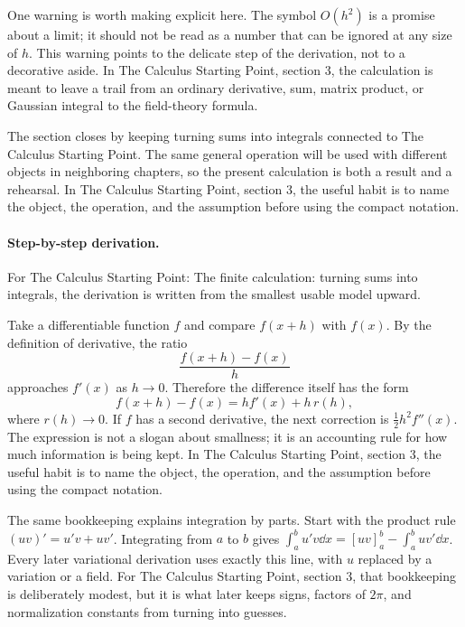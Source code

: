One warning is worth making explicit here.  The symbol \(O(h^2)\) is a promise about a limit; it should not be read as a number that can be ignored at any size of \(h\).  This warning points to the delicate step of the derivation, not to a decorative aside.  In The Calculus Starting Point, section 3, the calculation is meant to leave a trail from an ordinary derivative, sum, matrix product, or Gaussian integral to the field-theory formula.

The section closes by keeping turning sums into integrals connected to The Calculus Starting Point.  The same general operation will be used with different objects in neighboring chapters, so the present calculation is both a result and a rehearsal.  In The Calculus Starting Point, section 3, the useful habit is to name the object, the operation, and the assumption before using the compact notation.



\paragraph{Step-by-step derivation.}

For The Calculus Starting Point: The finite calculation: turning sums into integrals, the derivation is written from the smallest usable model upward.

Take a differentiable function \(f\) and compare \(f(x+h)\) with \(f(x)\).  By the definition of derivative, the ratio
\[
  \frac{f(x+h)-f(x)}{h}
\]
approaches \(f'(x)\) as \(h\to0\).  Therefore the difference itself has the form
\[
  f(x+h)-f(x)=hf'(x)+h\,r(h),
\]
where \(r(h)\to0\).  If \(f\) has a second derivative, the next correction is \(\frac12h^2f''(x)\).  The expression is not a slogan about smallness; it is an accounting rule for how much information is being kept.  In The Calculus Starting Point, section 3, the useful habit is to name the object, the operation, and the assumption before using the compact notation.

The same bookkeeping explains integration by parts.  Start with the product rule \((uv)'=u'v+uv'\).  Integrating from \(a\) to \(b\) gives \(\int_a^b u'v\dd x=[uv]_a^b-\int_a^buv'\dd x\).  Every later variational derivation uses exactly this line, with \(u\) replaced by a variation or a field.  For The Calculus Starting Point, section 3, that bookkeeping is deliberately modest, but it is what later keeps signs, factors of \(2\pi\), and normalization constants from turning into guesses.

